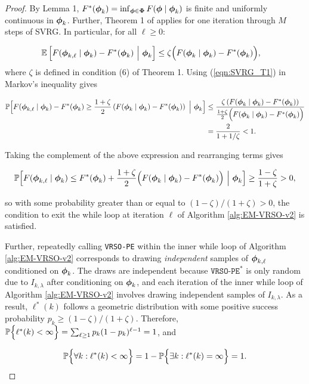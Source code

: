 \begin{proof}

By Lemma 1, $F^*(\boldsymbol{\phi}_k) = \inf_{\boldsymbol{\phi} \in \boldsymbol{\Phi}} F(\boldsymbol{\phi} \mid \boldsymbol{\phi}_k)$ is finite and uniformly continuous in $\boldsymbol{\phi}_k$. Further, Theorem 1 of \citet{Johnson:2013} applies for one iteration through $M$ steps of SVRG. In particular, for all $\ell \geq 0$:

\begin{align}
    \mathbb{E} & \left[F(\boldsymbol{\phi}_{k,\ell} \mid \boldsymbol{\phi}_{k}) - F^*(\boldsymbol{\phi}_k) ~\Big\vert~ \boldsymbol{\phi}_{k} \right] \leq \zeta \Big(F(\boldsymbol{\phi}_{k} \mid \boldsymbol{\phi}_{k}) - F^*(\boldsymbol{\phi}_k) \Big), \label{eqn:SVRG_T1}
\end{align}
%
where $\zeta$ is defined in condition (6) of Theorem 1. Using (\ref{eqn:SVRG_T1}) in Markov's inequality gives

\begin{align}
    \mathbb{P} \Big[F(\boldsymbol{\phi}_{k,\ell} \mid \boldsymbol{\phi}_{k}) - F^*(\boldsymbol{\phi}_{k}) \geq \frac{1 + \zeta}{2} \left(F(\boldsymbol{\phi}_{k} \mid \boldsymbol{\phi}_{k}) - F^*(\boldsymbol{\phi}_k) \right) ~\Big\vert~ \boldsymbol{\phi}_{k} \Big] &\leq \frac{\zeta \left( F(\boldsymbol{\phi}_{k} \mid \boldsymbol{\phi}_{k}) - F^*(\boldsymbol{\phi}_k) \right)}{\frac{1+\zeta}{2} \Big( F(\boldsymbol{\phi}_{k} \mid \boldsymbol{\phi}_{k}) - F^*(\boldsymbol{\phi}_k) \Big)} \\
    &= \frac{2}{1 + 1/\zeta} < 1.
\end{align}

Taking the complement of the above expression and rearranging terms gives

\begin{equation}
    \mathbb{P} \Big[F(\boldsymbol{\phi}_{k,\ell} \mid \boldsymbol{\phi}_{k}) \leq F^*(\boldsymbol{\phi}_{k}) + \frac{1 + \zeta}{2} \Big(F(\boldsymbol{\phi}_{k} \mid \boldsymbol{\phi}_{k}) - F^*(\boldsymbol{\phi}_{k}) \Big) ~\Big\vert~ \boldsymbol{\phi}_{k} \Big] \geq \frac{1-\zeta}{1 + \zeta} > 0 \label{eqn:markov_ineq},
\end{equation}

so with some probability greater than or equal to $(1-\zeta)/(1+\zeta) > 0$, the condition to exit the while loop at iteration $\ell$ of Algorithm \ref{alg:EM-VRSO-v2} is satisfied.

Further, repeatedly calling \texttt{VRSO-PE} within the inner while loop of Algorithm \ref{alg:EM-VRSO-v2} corresponds to drawing \textit{independent} samples of $\boldsymbol{\phi}_{k,\ell}$ conditioned on $\boldsymbol{\phi}_k$. The draws are independent because $\texttt{VRSO-PE}^*$ is only random due to $I_{k,\lambda}$ after conditioning on $\boldsymbol{\phi}_k$, and each iteration of the inner while loop of Algorithm \ref{alg:EM-VRSO-v2} involves drawing independent samples of $I_{k,\lambda}$. As a result, $\ell^*(k)$ follows a geometric distribution with some positive success probability $p_k \geq (1-\zeta)/(1+\zeta)$. Therefore, $\mathbb{P}\Big\{\ell^*(k) < \infty \Big\} = \sum_{\ell \geq 1} p_k(1-p_k)^{\ell-1} = 1$, and 

\begin{equation*}
    \mathbb{P}\Big\{\forall k : \ell^*(k) < \infty \Big\} = 1 - \mathbb{P}\Big\{\exists k : \ell^*(k) = \infty \Big\} = 1.
\end{equation*}
\end{proof}

